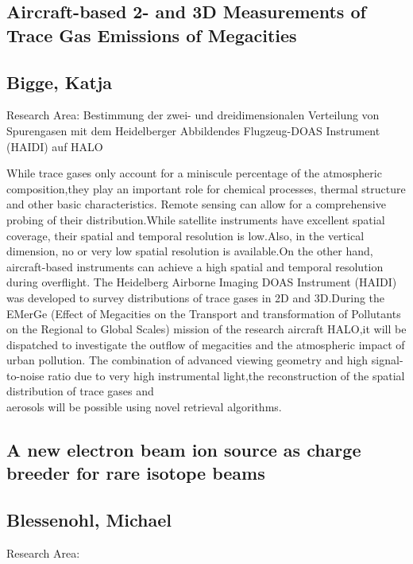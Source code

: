 \subsection*{\centering \large Aircraft-based 2- and 3D Measurements of Trace Gas Emissions of Megacities}
\subsection*{\centering \normalsize Bigge, Katja}
Research Area: Bestimmung der zwei- und dreidimensionalen Verteilung von Spurengasen mit dem Heidelberger Abbildendes Flugzeug-DOAS Instrument (HAIDI) auf HALO\newline

\noindent While trace gases only account for a miniscule percentage of the atmospheric composition,they play an important role for chemical processes, thermal structure and other basic characteristics. Remote sensing can allow for a comprehensive probing of their distribution.While satellite instruments have excellent spatial coverage, their spatial and temporal resolution is low.Also, in the vertical dimension, no or very low spatial resolution is available.On the other hand, aircraft-based instruments can achieve a high spatial and temporal resolution during overflight. The Heidelberg Airborne Imaging DOAS Instrument (HAIDI) was developed to survey distributions of trace gases in 2D and 3D.During the EMerGe (Effect of Megacities on the Transport and transformation of Pollutants on the Regional to Global Scales) mission of the research aircraft HALO,it will be dispatched to investigate the outflow of megacities and the atmospheric impact of urban pollution. The combination of advanced viewing geometry and high signal-to-noise ratio due to very high instrumental light,the reconstruction of the spatial distribution of trace gases and\\aerosols will be possible using novel retrieval algorithms.

\subsection*{\centering \large A new electron beam ion source as charge breeder for rare isotope beams}
\subsection*{\centering \normalsize Blessenohl, Michael}
Research Area: \newline

